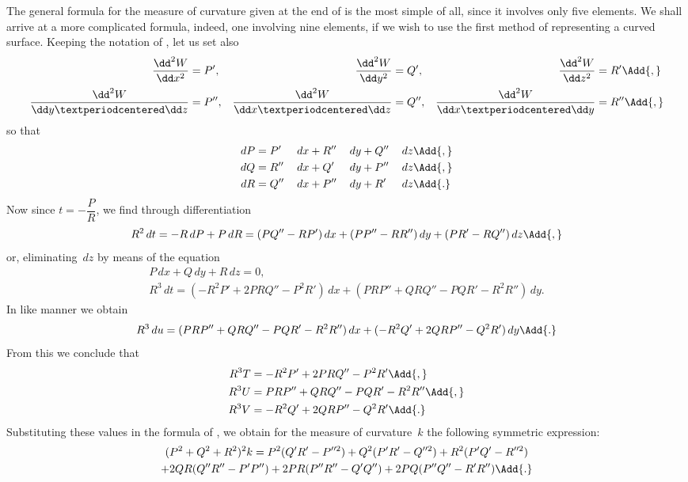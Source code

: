 The general formula for the measure of curvature given at the end of  is
the most simple of all, since it involves only five elements. We shall arrive at a
more complicated formula, indeed, one involving nine elements, if we wish to use the
first method of representing a curved surface. Keeping the notation of , let us
set also
\begin{align*}
\frac{\dd^{2} W}{\dd x^{2}} &= P', &
\frac{\dd^{2} W}{\dd y^{2}} &= Q', &
\frac{\dd^{2} W}{\dd z^{2}} &= R'\Add{,} \\
\frac{\dd^{2} W}{\dd y·\dd z} &= P'', &
\frac{\dd^{2} W}{\dd x·\dd z} &= Q'', &
\frac{\dd^{2} W}{\dd x·\dd y} &= R''\Add{,}
\end{align*}
so that
\begin{alignat*}{4}
dP &= P'\,  &&dx + R''\, &&dy + Q''\, &&dz\Add{,} \\
dQ &= R''\, &&dx + Q' \, &&dy + P''\, &&dz\Add{,} \\
dR &= Q''\, &&dx + P''\, &&dy + R' \, &&dz\Add{.}
\end{alignat*}
Now since $t = -\dfrac{P}{R}$, we find through differentiation
\[
R^{2}\, dt = -R\, dP + P\, dR
  = (PQ'' - RP')\, dx + (PP'' - RR'')\, dy + (PR' - RQ'')\, dz\Add{,}
\]
or, eliminating~$dz$ by means of the equation
\begin{gather*}
P\, dx + Q\, dy + R\, dz = 0, \\
R^{3}\, dt
  = (-R^{2}P' + 2PRQ'' - P^{2}R')\, dx + (PRP'' + QRQ'' - PQR' - R^{2}R'')\, dy.
\end{gather*}
In like manner we obtain
\[
R^{3}\, du
  = (PRP'' + QRQ'' - PQR' - R^{2}R'')\, dx + (-R^{2}Q' + 2QRP'' - Q^{2}R')\, dy\Add{.}
\]
From this we conclude that
\begin{align*}
R^{3}T &= -R^{2}P' + 2PRQ'' - P^{2}R'\Add{,} \\
R^{3}U &= PRP'' + QRQ'' - PQR' - R^{2}R''\Add{,} \\
R^{3}V &= -R^{2}Q' + 2QRP'' - Q^{2}R'\Add{.}
\end{align*}
Substituting these values in the formula of , we obtain for the measure of curvature~$k$
the following symmetric expression:
\begin{multline*}
(P^{2} + Q^{2} + R^{2})^{2}k
  = P^{2}(Q'R' - P''^{2})
  + Q^{2}(P'R' - Q''^{2})
  + R^{2}(P'Q' - R''^{2}) \\
  + 2QR(Q''R'' - P'P'')
  + 2PR(P''R'' - Q'Q'')
  + 2PQ(P''Q'' - R'R'')\Add{.}
\end{multline*}


